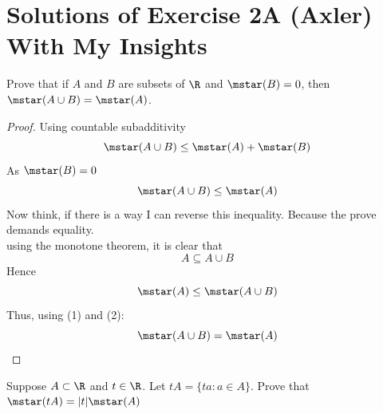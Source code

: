     \section{Solutions of Exercise 2A (Axler) With My Insights}
    \begin{exercise}
        Prove that if $A$ and $B$ are subsets of $\R$ and $\mstar(B)=0$, then $\mstar(A\cup B)=\mstar(A)$.
    \end{exercise} 
    \begin{proof}
        Using countable subadditivity
        \[
        \mstar(A\cup B) \leq \mstar(A) + \mstar(B)
        \]
        As $\mstar(B)= 0$
        \begin{equation}
            \mstar(A\cup B) \leq \mstar(A)
        \end{equation}
        Now think, if there is a way I can reverse this inequality. Because the prove demands equality.\\
        using the monotone theorem, it is clear that
        \[
        A \subseteq A\cup B
        \]
        Hence
        \begin{equation}
        \mstar(A) \leq \mstar(A\cup B)
        \end{equation}
            Thus, using (1) and (2):
       \[
       \mstar(A\cup B)=\mstar(A)
       \]       
        \end{proof}
    \begin{exercise}
        Suppose $A \subset \R$ and $t\in \R$. Let $tA = \{ta : a\in A\}$. Prove that $\mstar(tA) = |t| \mstar(A)$
    \end{exercise}

